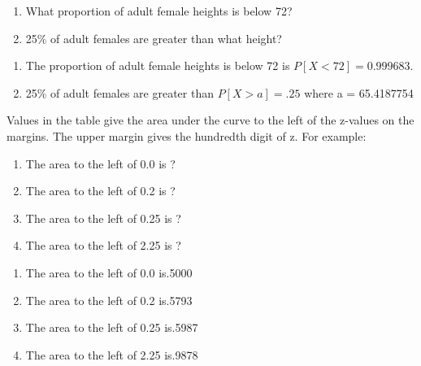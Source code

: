 \documentclass[11pt, chapterprefix=true]{scrbook}\usepackage[]{graphicx}\usepackage[]{color}
\begin{document}
\begin{exercises}
\begin{exercise}
\begin{enumerate}
\item What proportion of adult female heights is below 72?
\item 25\% of adult females are greater than what height?
\end{enumerate}

  \end{exercise}
\begin{solution}  %


\begin{enumerate}
\item The proportion of adult female heights is below 72 is $P[ X < 72] = 0.999683$.
\item 25\% of adult females are greater than $P[ X > a] = .25$ where a = 65.4187754
\end{enumerate}
\end{solution}

\begin{exercise} %

Values in the table give the area under the curve to the left of the z-values on the margins.  The upper margin gives the hundredth digit of z.  For example:

\begin{enumerate}
\item The area to the left of 0.0 is ?
\item The area to the left of 0.2 is ?
\item The area to the left of 0.25 is ?
\item The area to the left of 2.25 is ?
\end{enumerate}

	\end{exercise}
\begin{solution}  %

\begin{enumerate}
\item The area to the left of 0.0 is.5000
\item The area to the left of 0.2 is.5793
\item The area to the left of 0.25 is.5987
\item The area to the left of 2.25 is.9878
\end{enumerate}
\end{solution}

\end{exercises}

 \onecolumn
\end{document}
